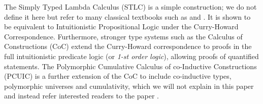The Simply Typed Lambda Calculus (STLC) is a simple construction; we do not
define it here but refer to many classical textbooks such as
 and . It is shown to
be equivalent to Intuitionistic Propositional Logic under the Curry-Howard
Correspondence. Furthermore, stronger type systems such as the Calculus of Constructions (CoC)
 extend the Curry-Howard correspondence to proofs 
in the full intuitionistic predicate logic (or \emph{1-st order logic}), allowing
proofs of quantified statements. The Polymorphic Cumulative Calculus of co-Inductive
Constructions (PCUIC) is a further extension of the CoC to include co-inductive
types, polymorphic universes and cumulativity, which we will not explain in this
paper and instead refer interested readers to the paper .
